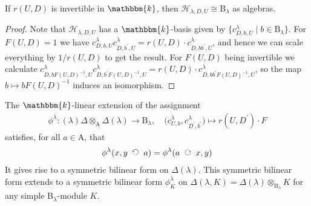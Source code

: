 \documentclass[a4paper,11pt]{amsart}
\newcommand{\actsleft}{\mathop{\,\;\raisebox{1.7ex}{\rotatebox{-90}{$\circlearrowright$}}\;\,}}
\newcommand{\actsright}{\mathop{\,\;\raisebox{0ex}{\rotatebox{90}{$\circlearrowleft$}}\;\,}}
\newcommand{\setstuff}[1]{\mathrm{#1}}
\newcommand{\hcirc}{\otimes}
\newcommand{\KK}{\mathbbm{k}}
\numberwithin{equation}{section}
\begin{document}
\begin{lemma}\label{lemma:h-subalgebra}
If $r(U,D)$ is invertible in $\KK$, then 
$\mathcal{H}_{\lambda,D,U}\cong\setstuff{B}_{\lambda}$ as algebras.
\end{lemma}

\begin{proof}
Note that $\mathcal{H}_{\lambda,D,U}$ 
has a $\KK$-basis given by 
$\{c_{D,b,U}^{\lambda}\mid b\in\setstuff{B}_{\lambda}\}$. 
For $F(U,D)=1$ we have
$c_{D,b,U}^{\lambda}c_{D,b^{\prime},U}^{\lambda}
=r(U,D)\cdot c_{D,bb^{\prime},U}^{\lambda}$, and hence 
we can scale everything by $1/r(U,D)$ to get the result.
For $F(U,D)$ being invertible we calculate 
$c_{D,bF(U,D)^{-1},U}^{\lambda}c_{D,b^{\prime}F(U,D)^{-1},U}^{\lambda}
=r(U,D)\cdot c_{D,bb^{\prime}F(U,D)^{-1},U}^{\lambda}$, 
so the map $b\mapsto bF(U,D)^{-1}$ induces an isomorphism.
\end{proof}

\begin{lemma}\label{lemma:bilinearform}
The $\KK$-linear extension 
of the assignment
\begin{gather*}
\phi^{\lambda}\colon
(\lambda)\Delta\hcirc_{\setstuff{A}}
\Delta(\lambda)\to\setstuff{B}_{\lambda}
,\quad
\big(c_{U,b}^{\lambda},c_{D^{\prime},b^{\prime}}^{\lambda}
\big)\mapsto
r(U,D^{\prime})\cdot F
\end{gather*}
satisfies, for all $a\in\setstuff{A}$, that
\begin{gather*}
\phi^{\lambda}
(x,y\actsright a)=
\phi^{\lambda}
(a\actsleft x,y)
\end{gather*}
It gives rise to a symmetric bilinear form on $\Delta(\lambda)$. 
This symmetric bilinear form extends to 
a symmetric bilinear form $\phi^{\lambda}_{K}$
on $\Delta(\lambda,K)=\Delta(\lambda)\hcirc_{\setstuff{B}_{\lambda}}K$ 
for any simple $\setstuff{B}_{\lambda}$-module $K$.
\end{lemma}
\end{document}
